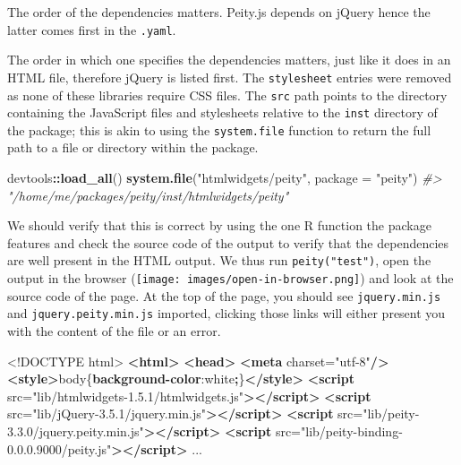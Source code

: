\documentclass[10pt,]{krantz}
\makeatletter
\newenvironment{Shaded}{\begin{snugshade}}{\end{snugshade}}
\newcommand{\CommentTok}[1]{\textcolor[rgb]{0.37,0.37,0.37}{\textit{#1}}}
\newcommand{\ConstantTok}[1]{\textcolor[rgb]{0,0,0}{#1}}
\newcommand{\DataTypeTok}[1]{\textcolor[rgb]{0.27,0.27,0.27}{#1}}
\newcommand{\KeywordTok}[1]{\textcolor[rgb]{0.27,0.27,0.27}{\textbf{#1}}}
\newcommand{\NormalTok}[1]{#1}
\newcommand{\OperatorTok}[1]{\textcolor[rgb]{0.43,0.43,0.43}{\textbf{#1}}}
\newcommand{\OtherTok}[1]{\textcolor[rgb]{0.37,0.37,0.37}{#1}}
\newcommand{\StringTok}[1]{\textcolor[rgb]{0.5,0.5,0.5}{#1}}
\newenvironment{kframe}{%
\medskip{}
\setlength{\fboxsep}{.8em}
 \def\at@end@of@kframe{}%
 \ifinner\ifhmode%
  \def\at@end@of@kframe{\end{minipage}}%
  \begin{minipage}{\columnwidth}%
 \fi\fi%
 \def\FrameCommand##1{\hskip\@totalleftmargin \hskip-\fboxsep
 \colorbox{shadecolor}{##1}\hskip-\fboxsep
     \hskip-\linewidth \hskip-\@totalleftmargin \hskip\columnwidth}%
 \MakeFramed {\advance\hsize-\width
   \@totalleftmargin\z@ \linewidth\hsize
   \@setminipage}}%
 {\par\unskip\endMakeFramed%
 \at@end@of@kframe}
\renewenvironment{Shaded}{\begin{kframe}}{\end{kframe}}
\newenvironment{rmdblock}[1]
  {
  \begin{itemize}
  \renewcommand{\labelitemi}{
    \raisebox{-.7\height}[0pt][0pt]{
      {\setkeys{Gin}{width=3em,keepaspectratio}\texttt{[image: images/\#1]}}
    }
  }
  \setlength{\fboxsep}{1em}
  \begin{kframe}
  \item
  }
  {
  \end{kframe}
  \end{itemize}
  }
\newenvironment{rmdnote}
  {\begin{rmdblock}{note}}
  {\end{rmdblock}}
\makeatother
\begin{document}
\begin{rmdnote}
The order of the dependencies matters. Peity.js depends on jQuery hence
the latter comes first in the \texttt{.yaml}.
\end{rmdnote}

The order in which one specifies the dependencies matters, just like it does in an HTML file, therefore jQuery is listed first. The \texttt{stylesheet} entries were removed as none of these libraries require CSS files. The \texttt{src} path points to the directory containing the JavaScript files and stylesheets relative to the \texttt{inst} directory of the package; this is akin to using the \texttt{system.file} function to return the full path to a file or directory within the package.

\begin{Shaded}
\begin{Highlighting}[]
\NormalTok{devtools}\OperatorTok{::}\KeywordTok{load_all}\NormalTok{()}
\KeywordTok{system.file}\NormalTok{(}\StringTok{"htmlwidgets/peity"}\NormalTok{, }\DataTypeTok{package =} \StringTok{"peity"}\NormalTok{)                                         }
\CommentTok{#> "/home/me/packages/peity/inst/htmlwidgets/peity"}
\end{Highlighting}
\end{Shaded}

We should verify that this is correct by using the one R function the package features and check the source code of the output to verify that the dependencies are well present in the HTML output. We thus run \texttt{peity("test")}, open the output in the browser (\texttt{[image: images/open-in-browser.png]}) and look at the source code of the page. At the top of the page, you should see \texttt{jquery.min.js} and \texttt{jquery.peity.min.js} imported, clicking those links will either present you with the content of the file or an error.

\begin{Shaded}
\begin{Highlighting}[]
\DataTypeTok{<!DOCTYPE }\NormalTok{html}\DataTypeTok{>}
\KeywordTok{<html>}
\KeywordTok{<head>}
\KeywordTok{<meta}\OtherTok{ charset=}\StringTok{"utf-8"}\KeywordTok{/>}
\KeywordTok{<style>}\NormalTok{body\{}\KeywordTok{background-color}\NormalTok{:}\ConstantTok{white}\OperatorTok{;}\NormalTok{\}}\KeywordTok{</style>}
\KeywordTok{<script}\OtherTok{ src=}\StringTok{"lib/htmlwidgets-1.5.1/htmlwidgets.js"}\KeywordTok{></script>}
\KeywordTok{<script}\OtherTok{ src=}\StringTok{"lib/jQuery-3.5.1/jquery.min.js"}\KeywordTok{></script>}
\KeywordTok{<script}\OtherTok{ src=}\StringTok{"lib/peity-3.3.0/jquery.peity.min.js"}\KeywordTok{></script>}
\KeywordTok{<script}\OtherTok{ src=}\StringTok{"lib/peity-binding-0.0.0.9000/peity.js"}\KeywordTok{></script>}
\NormalTok{...}
\end{Highlighting}
\end{Shaded}
\end{document}
